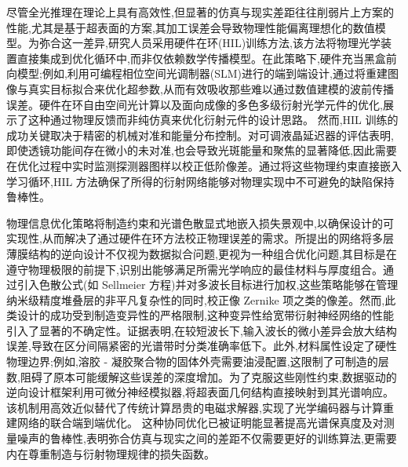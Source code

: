 尽管全光推理在理论上具有高效性,但显著的仿真与现实差距往往削弱片上方案的性能,尤其是基于超表面的方案,其加工误差会导致物理性能偏离理想化的数值模型。为弥合这一差异,研究人员采用硬件在环(HIL)训练方法,该方法将物理光学装置直接集成到优化循环中,而非仅依赖数学传播模型。在此策略下,硬件充当黑盒前向模型;例如,利用可编程相位空间光调制器(SLM)进行的端到端设计,通过将重建图像与真实目标拟合来优化超参数,从而有效吸收那些难以通过数值建模的波前传播误差。硬件在环自由空间光计算以及面向成像的多色多级衍射光学元件的优化,展示了这种通过物理反馈而非纯仿真来优化衍射元件的设计思路。\citep{doi_10_1109_icton67126_2025_11125227_383c0a4a} 然而,HIL 训练的成功关键取决于精密的机械对准和能量分布控制。对可调液晶延迟器的评估表明,即使透镜功能间存在微小的未对准,也会导致光斑能量和聚焦的显著降低,因此需要在优化过程中实时监测探测器图样以校正低阶像差。通过将这些物理约束直接嵌入学习循环,HIL 方法确保了所得的衍射网络能够对物理实现中不可避免的缺陷保持鲁棒性。\citep{doi_10_1038_s41598_025_19638_8_1b2db1c9} \citep{doi_10_1364_oe_461549_b2d41b3f} \citep{doi_10_1021_acsphotonics_4c01284_s001_10346917}

物理信息优化策略将制造约束和光谱色散显式地嵌入损失景观中,以确保设计的可实现性,从而解决了通过硬件在环方法校正物理误差的需求。所提出的网络将多层薄膜结构的逆向设计不仅视为数据拟合问题,更视为一种组合优化问题,其目标是在遵守物理极限的前提下,识别出能够满足所需光学响应的最佳材料与厚度组合。通过引入色散公式(如 Sellmeier 方程)并对多波长目标进行加权,这些策略能够在管理纳米级精度堆叠层的非平凡复杂性的同时,校正像 Zernike 项之类的像差。然而,此类设计的成功受到制造变异性的严格限制,这种变异性给宽带衍射神经网络的性能引入了显著的不确定性。证据表明,在较短波长下,输入波长的微小差异会放大结构误差,导致在区分间隔紧密的光谱带时分类准确率低下。此外,材料属性设定了硬性物理边界;例如,溶胶 - 凝胶聚合物的固体外壳需要油浸配置,这限制了可制造的层数,阻碍了原本可能缓解这些误差的深度增加。为了克服这些刚性约束,数据驱动的逆向设计框架利用可微分神经模拟器,将超表面几何结构直接映射到其光谱响应。该机制用高效近似替代了传统计算昂贵的电磁求解器,实现了光学编码器与计算重建网络的联合端到端优化。\citep{s2_76a83ea3baed75ad88b7f0782eb9a694a330c853_cee16cac} \citep{doi_10_1002_admt_202401999_652aff4b} 这种协同优化已被证明能显著提高光谱保真度及对测量噪声的鲁棒性,表明弥合仿真与现实之间的差距不仅需要更好的训练算法,更需要内在尊重制造与衍射物理规律的损失函数。\citep{doi_10_1016_j_isci_2025_112222_1f7c10f5} \citep{doi_10_1002_adpr_202300310_6647aa64} \citep{s2_76a83ea3baed75ad88b7f0782eb9a694a330c853_cee16cac}

